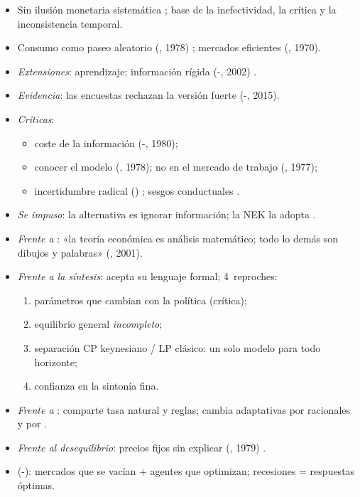 \documentclass{article}
\begin{document}
\begin{columnas}
\begin{itemize}
\item Sin ilusión monetaria sistemática ; base de la inefectividad, la crítica y la inconsistencia temporal.
\item Consumo como paseo aleatorio (, 1978) ; mercados eficientes (, 1970).
\item \emph{Extensiones}: aprendizaje; información rígida (-, 2002) .
\item \emph{Evidencia}: las encuestas rechazan la versión fuerte (-, 2015).
\item \emph{Críticas}:
  \begin{itemize}
  \item coste de la información (-, 1980);
  \item conocer el modelo (, 1978); no en el mercado de trabajo (, 1977);
  \item incertidumbre radical () ; sesgos conductuales .
  \end{itemize}
\item \emph{Se impuso}: la alternativa es ignorar información; la NEK la adopta .
\end{itemize}

\begin{itemize}
\item \emph{Frente a }: «la teoría económica es análisis matemático; todo lo demás son dibujos y palabras» (, 2001).
\item \emph{Frente a la síntesis}: acepta su lenguaje formal; 4~reproches:
  \begin{enumerate}
  \item parámetros que cambian con la política (crítica);
  \item equilibrio general \emph{incompleto};
  \item separación CP keynesiano / LP clásico: un solo modelo para todo horizonte;
  \item confianza en la sintonía fina.
  \end{enumerate}
\item \emph{Frente a }: comparte tasa natural y reglas; cambia adaptativas por racionales y  por  .
\item \emph{Frente al desequilibrio}: precios fijos sin explicar (, 1979) .
\item {} (-): mercados que se vacían + agentes que optimizan; recesiones = respuestas óptimas.
\end{itemize}


\end{columnas}
\end{document}
